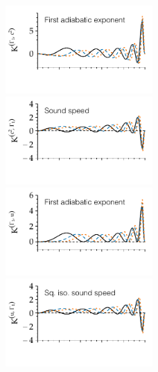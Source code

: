 \begin{figure}
    \centering
    \includegraphics[width=0.5\textwidth,trim={0 1.1cm 0 0}, clip]{figs/pulse/kernels/kernel-ell-Gamma1_c2-diffusion.pdf}%
    \includegraphics[width=0.5\textwidth,trim={0 1.1cm 0 0}, clip]{figs/pulse/kernels/kernel-ell-c2_Gamma1-diffusion.pdf}\\
    \includegraphics[width=0.5\textwidth,trim={0 1.1cm 0 0}, clip]{figs/pulse/kernels/kernel-ell-Gamma1_u-diffusion.pdf}%
    \includegraphics[width=0.5\textwidth,trim={0 1.1cm 0 0}, clip]{figs/pulse/kernels/kernel-ell-u_Gamma1-diffusion.pdf}\\

\end{figure}
